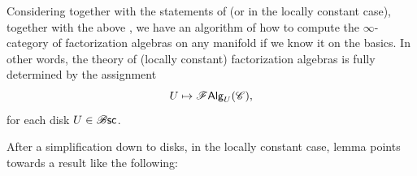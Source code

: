 \documentclass[../text]{subfiles}
\begin{document}
Considering  together with the statements of  (or  in the locally constant case), together with the above , we have an algorithm of how to compute the $\infty$-category of factorization algebras on any manifold if we know it on the basics. In other words, the theory of (locally constant) factorization algebras is fully determined by the assignment
%
\begin{equation}
    U \mapsto \mathscr{F} \mathsf{Alg}_U (\mathscr{C}),
\end{equation}
%
for each disk $U \in \mathscr{B} \mathsf{sc}$.

After a simplification down to disks, in the locally constant case, lemma  points towards a result like the following:





\end{document}
